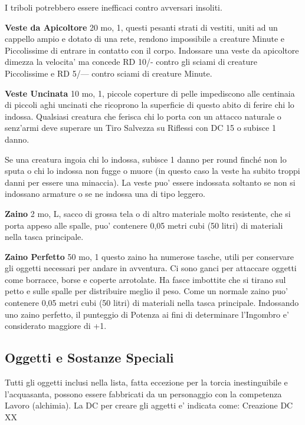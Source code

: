 \documentclass[a4paper,11pt,twoside,openany]{book}
\begin{document}
{		I triboli potrebbero essere inefficaci contro avversari insoliti.
		
		\textbf{Veste da Apicoltore} 20 mo, 1, questi pesanti strati di vestiti, uniti ad un cappello ampio e dotato di una rete, rendono impossibile a creature Minute e Piccolissime di entrare in contatto con il corpo. Indossare una veste da apicoltore dimezza la velocita' ma concede RD 10/- contro gli sciami di creature Piccolissime e RD 5/--- contro sciami di creature Minute.
		
		\textbf{Veste Uncinata} 10 mo, 1, piccole coperture di pelle impediscono alle centinaia di piccoli aghi uncinati che ricoprono la superficie di questo abito di ferire chi lo indossa. Qualsiasi creatura che ferisca chi lo porta con un attacco naturale o senz'armi deve superare un Tiro Salvezza su Riflessi con DC 15 o subisce 1 danno.
		
		Se una creatura ingoia chi lo indossa, subisce 1 danno per round finché non lo sputa o chi lo indossa non fugge o muore (in questo caso la veste ha subito troppi danni per essere una minaccia). La veste puo' essere indossata soltanto se non si indossano armature o se ne indossa una di tipo leggero.
		
		\textbf{Zaino} 2 mo, L, sacco di grossa tela o di altro materiale molto resistente, che si porta appeso alle spalle, puo' contenere 0,05 metri cubi (50 litri) di materiali nella tasca principale. 
		
		\textbf{Zaino Perfetto} 50 mo, 1 questo zaino ha numerose tasche, utili per conservare gli oggetti necessari per andare in avventura. Ci sono ganci per attaccare oggetti come borracce, borse e coperte arrotolate.
		Ha fasce imbottite che si tirano sul petto e sulle spalle per distribuire meglio il peso. Come un normale zaino puo' contenere 0,05 metri cubi (50 litri) di materiali nella tasca principale. Indossando uno zaino perfetto, il punteggio di Potenza ai fini di determinare l'Ingombro e' considerato maggiore di +1.
		
		\subsection{Oggetti e Sostanze Speciali}
		
		\label{oggetti-e-sostanze-speciali}
		
		Tutti gli oggetti inclusi nella lista, fatta eccezione per la torcia inestinguibile e l'acquasanta, possono essere fabbricati da un personaggio con la competenza Lavoro (alchimia). La DC per creare gli aggetti e' indicata come: Creazione DC XX
		
}
\end{document}
